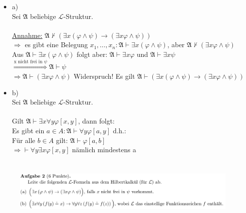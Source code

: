 \documentclass[a4paper]{scrartcl}
\begin{document}
    \begin{itemize}
        \item a)\\
            Sei $\mathfrak{A}$ beliebige $\mathscr{L}$-Struktur.\\
            \\\underline{Annahme:} $\mathfrak{A} \nvdash (\exists x(\varphi \land \psi) \rightarrow (\exists x \varphi \land \psi))$\\
            $\Rightarrow$ es gibt eine Belegung $x_1,\dots,x_n: \mathfrak{A} \vdash \exists x(\varphi \land \psi)$, 
            aber $\mathfrak{A} \nvdash (\exists x \varphi \land \psi)$\\
            Aus $\mathfrak{A} \vdash \exists x (\varphi \land \psi)$ folgt aber: $\mathfrak{A} \vdash \exists x \varphi$ und $\mathfrak{A} \vdash \exists x \psi$\\
            $\overset{\text{x nicht frei in } \psi}{\Rightarrow} \mathfrak{A} \vdash \psi$\\
            $\Rightarrow \mathfrak{A} \vdash (\exists x \varphi \land \psi)$ Widerspruch! 
            Es gilt $\mathfrak{A} \vdash (\exists x(\varphi \land \psi) \rightarrow (\exists x \varphi \land \psi))$\\
        \item b)\\
            Sei $\mathfrak{A} \text{ beliebige } \mathscr{L}\text{-Struktur.}$\\
            \\Gilt $\mathfrak{A} \vdash \exists x \forall y \varphi[x,y]$, dann folgt:\\
            Es gibt ein $a \in A: \mathfrak{A} \vdash \forall y \varphi[a,y]$ d.h.:\\
            Für alle $b \in A$ gilt: $\mathfrak{A} \vdash \varphi[a,b]$\\
            $\Rightarrow \vdash \forall y \exists x \varphi[x,y]$ nämlich mindestens a
    \end{itemize}%

\section*{}%
\label{sec:aufgabe_2}

    \begin{figure}[H]
        \centering
        \includegraphics[scale=0.3]{./A-2.png}
        \label{fig:}
    \end{figure}
\end{document}
